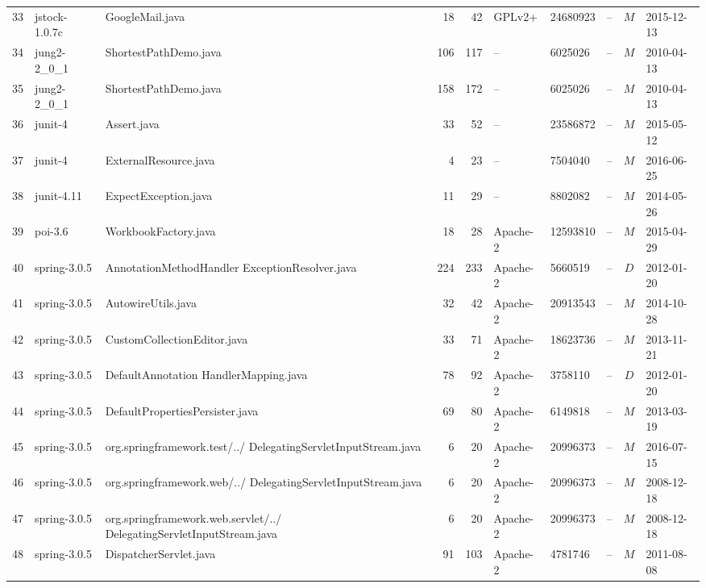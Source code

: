 \documentclass{sig-alternate-05-2015}
\begin{document}
\begin{table}
{\begin{tabular}{r|l|p{4.5cm}|r|r|l|l|l|c|l}
			33 & jstock-1.0.7c  & GoogleMail.java  & 18 & 42 & GPLv2+ & 24680923 & -- & $M$  & 2015-12-13 \\
			34 & jung2-2\_0\_1  & ShortestPathDemo.java  & 106 & 117 & -- & 6025026 & -- & $M$  & 2010-04-13 \\
			35 & jung2-2\_0\_1  & ShortestPathDemo.java  & 158 & 172 & -- & 6025026 & -- & $M$  & 2010-04-13 \\
			36 & junit-4  & Assert.java  & 33 & 52 & -- & 23586872 & -- & $M$  & 2015-05-12 \\
			37 & junit-4  & ExternalResource.java  & 4 & 23 & -- & 7504040 & -- & $M$  & 2016-06-25 \\
			38 & junit-4.11  & ExpectException.java  & 11 & 29 & -- & 8802082 & -- & $M$  & 2014-05-26 \\
			39 & poi-3.6  & WorkbookFactory.java  & 18 & 28 & Apache-2 & 12593810 & -- & $M$  & 2015-04-29 \\
			40 & spring-3.0.5  & AnnotationMethodHandler \newline ExceptionResolver.java  & 224 & 233 & Apache-2 & 5660519 & -- & $D$  & 2012-01-20 \\
			41 & spring-3.0.5  & AutowireUtils.java  & 32 & 42 & Apache-2 & 20913543 & -- & $M$  & 2014-10-28 \\
			42 & spring-3.0.5  & CustomCollectionEditor.java  & 33 & 71 & Apache-2 & 18623736 & -- & $M$  & 2013-11-21 \\
			43 & spring-3.0.5  & DefaultAnnotation \newline HandlerMapping.java  & 78 & 92 & Apache-2 & 3758110 & -- & $D$  & 2012-01-20 \\
			44 & spring-3.0.5  & DefaultPropertiesPersister.java  & 69 & 80 & Apache-2 & 6149818 & -- & $M$  & 2013-03-19 \\
			45 & spring-3.0.5  & org.springframework.test/../ \newline DelegatingServletInputStream.java  & 6 & 20 & Apache-2 & 20996373 & -- & $M$  & 2016-07-15 \\
			46 & spring-3.0.5  & org.springframework.web/../ \newline DelegatingServletInputStream.java  & 6 & 20 & Apache-2 & 20996373 & -- & $M$  & 2008-12-18 \\
			47 & spring-3.0.5  & org.springframework.web.servlet/../ \newline DelegatingServletInputStream.java  & 6 & 20 & Apache-2 & 20996373 & -- & $M$  & 2008-12-18 \\
			48 & spring-3.0.5  & DispatcherServlet.java  & 91 & 103 & Apache-2 & 4781746 & -- & $M$  & 2011-08-08 \\

\end{tabular}}
\end{table}
\end{document}
